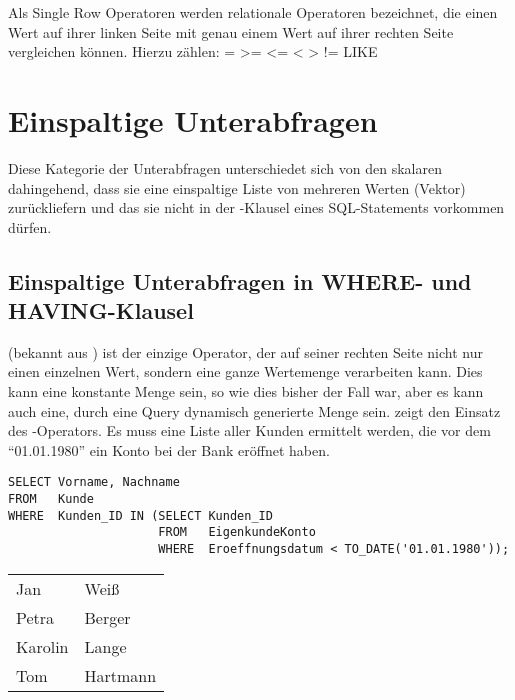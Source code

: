 \begin{merke}
    Als Single Row Operatoren werden relationale Operatoren bezeichnet, die einen Wert auf ihrer linken Seite mit genau einem Wert auf ihrer rechten Seite vergleichen können. Hierzu zählen: = >= <= < > != LIKE
\end{merke}
\section{Einspaltige Unterabfragen}
Diese Kategorie der Unterabfragen unterschiedet sich von den skalaren dahingehend, dass sie eine einspaltige Liste von mehreren Werten (Vektor) zurückliefern und das sie nicht in der \SELECT-Klausel eines SQL-Statements vorkommen dürfen.
\subsection{Einspaltige Unterabfragen in WHERE- und HAVING-Klausel}
 (bekannt aus ) ist der einzige Operator, der auf seiner rechten Seite nicht nur einen einzelnen Wert, sondern eine ganze Wertemenge verarbeiten kann. Dies kann eine konstante Menge sein, so wie dies bisher der Fall war, aber es kann auch eine, durch eine Query dynamisch generierte Menge sein.  zeigt den Einsatz des -Operators. Es muss eine Liste aller Kunden ermittelt werden, die vor dem \enquote{01.01.1980} ein Konto bei der Bank eröffnet haben.
\begin{lstlisting}[language=oracle_sql,caption={\languageorasql{IN} mit Unterabfrage},label=sql06_07]
SELECT Vorname, Nachname
FROM   Kunde
WHERE  Kunden_ID IN (SELECT Kunden_ID
                     FROM   EigenkundeKonto
                     WHERE  Eroeffnungsdatum < TO_DATE('01.01.1980'));
        \end{lstlisting}
\begin{center}
    \begin{small}
        \tablehead{}
        \begin{msoraclesql}
            \begin{supertabular}{ll}
                Jan & Weiß \\
                Petra & Berger \\
                Karolin & Lange \\
                Tom & Hartmann \\
            \end{supertabular}
        \end{msoraclesql}
    \end{small}
\end{center}
